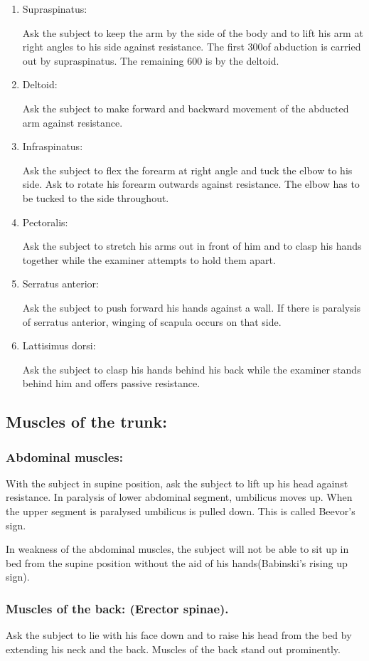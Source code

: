 \documentclass[a4paper,12pt,openany,oneside]{book}
\begin{document}
\begin{enumerate}
{The subject is asked to extend the flexed forearm against resistance.
}
\item{ Supraspinatus: 
\par
Ask the subject to keep the arm by the side of the body and to lift his arm at right angles to his side against resistance. The first 300of abduction is carried out by supraspinatus. The remaining 600 is by the deltoid.
}
\item{ Deltoid: 
\par
Ask the subject to make forward and backward movement of the abducted arm against resistance.
}
\item{ Infraspinatus: 
\par
Ask the subject to flex the forearm at right angle and tuck the elbow to his side. Ask to rotate his forearm outwards against resistance. The elbow has to be tucked to the side throughout.
}
\item{ Pectoralis: 
\par
Ask the subject to stretch his arms out in front of him and to clasp his hands together while the examiner attempts to hold them apart.
}
\item{ Serratus anterior: 
\par
Ask the subject to push forward his hands against a wall. If there is paralysis of serratus anterior, winging of scapula occurs on that side.
}
\item{ Lattisimus dorsi: 
\par
Ask the subject to clasp his hands behind his back while the examiner stands behind him and offers passive resistance.
}	
\end{enumerate}
\subsection*{Muscles	of	the	trunk:}	
\subsubsection*{Abdominal muscles:}
	With the subject in supine position, ask the subject to lift up his head against resistance. In paralysis of lower abdominal segment, umbilicus moves up. When the upper segment is paralysed umbilicus is pulled down. This is called Beevor's sign.
	\par
	In weakness of the abdominal muscles, the subject will not be able to sit up in bed from the supine position without the aid of his hands(Babinski’s rising up sign).
	\subsubsection*{Muscles of the back: (Erector spinae).}
	Ask the subject to lie with his face down and to raise his head from the bed by extending his neck and the back. Muscles of the back stand out prominently.
\end{document}
